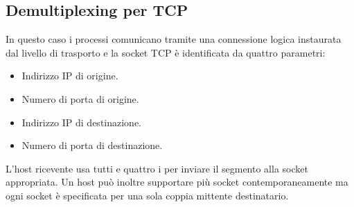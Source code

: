 \subsection{Demultiplexing per TCP}
In questo caso i processi comunicano tramite una connessione logica instaurata dal livello di
trasporto e la socket TCP è identificata da quattro parametri:
\begin{itemize}
	\item Indirizzo IP di origine.
	\item Numero di porta di origine.
	\item Indirizzo IP di destinazione.
	\item Numero di porta di destinazione.
\end{itemize}
L'host ricevente usa tutti e quattro i per inviare il segmento alla socket appropriata. Un host può
inoltre supportare più socket contemporaneamente ma ogni socket è specificata per una sola coppia
mittente destinatario.